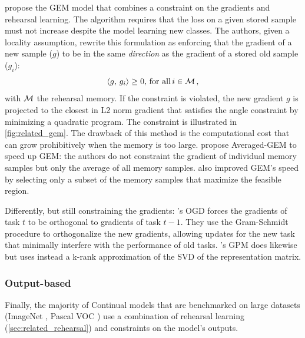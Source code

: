 \cite{lopezpaz2017gem} propose the GEM model that combines a constraint on the gradients and
rehearsal learning. The algorithm requires that the loss on a given stored sample must not increase
despite the model learning new classes. The authors, given a locality assumption, rewrite this
formulation as enforcing that the gradient of a new sample ($g$) to be in the same \textit{direction} as
the gradient of a stored old sample ($g_i$):
%
\begin{equation}
      \langle g,\, g_i\rangle \ge 0,\, \text{for all}\, i \in \mathcal{M}\,,
\end{equation}
%
\noindent with $\mathcal{M}$ the rehearsal memory. If the constraint is violated, the new gradient $g$ is
projected to the closest in L2 norm gradient that satisfies the angle constraint by minimizing a
quadratic program. The constraint is illustrated in \autoref{fig:related_gem}. The drawback of this
method is the computational cost that can grow prohibitively when the memory is too large.
\cite{chaudhry2019AGEM} propose Averaged-GEM to speed up GEM: the authors do not constraint the
gradient of individual memory samples but only the average of all memory samples.
\cite{aljundi2019gradientselection} also improved GEM's speed by selecting only a subset of the
memory samples that maximize the feasible region.

Differently, but still constraining the gradients: \cite{farajtabar2020ogd}'s OGD forces the gradients of
task $t$ to be orthogonal to gradients of task $t-1$. They use the Gram-Schmidt procedure to
orthogonalize the new gradients, allowing updates for the new task that minimally interfere with the
performance of old tasks. \cite{saha2021gpm}'s GPM does likewise but uses instead a k-rank
approximation of the SVD of the representation matrix.


\subsubsection{Output-based}
\label{sec:related_regul_output}

Finally, the majority of Continual models that are benchmarked on large datasets (\eg ImageNet
\citep{deng2009imagenet}, Pascal VOC \citep{everingham2015pascalvoc}) use a combination of rehearsal
learning (\autoref{sec:related_rehearsal}) and constraints on the model's outputs.

